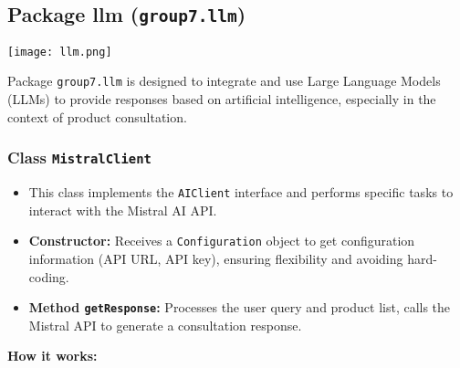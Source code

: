 \documentclass{article}
\begin{document}
\subsection{Package llm (\texttt{group7.llm})}

\texttt{[image: llm.png]} %

Package \texttt{group7.llm} is designed to integrate and use Large Language Models (LLMs) to provide responses based on artificial intelligence, especially in the context of product consultation.

\subsubsection*{Class \texttt{MistralClient}}
\begin{itemize}
    \item This class implements the \texttt{AIClient} interface and performs specific tasks to interact with the Mistral AI API.
    \item \textbf{Constructor:} Receives a \texttt{Configuration} object to get configuration information (API URL, API key), ensuring flexibility and avoiding hard-coding.
    \item \textbf{Method \texttt{getResponse}:} Processes the user query and product list, calls the Mistral API to generate a consultation response.
\end{itemize}
\textbf{How it works:}
\end{document}
